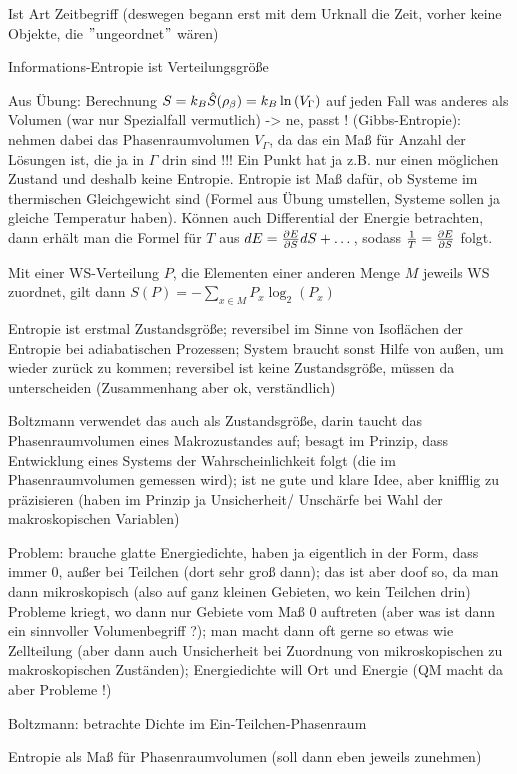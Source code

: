 Ist Art Zeitbegriff (deswegen begann erst mit dem Urknall die Zeit, vorher keine Objekte, die $"$ungeordnet$"$ wären)

Informations-Entropie ist Verteilungsgröße

Aus Übung: Berechnung $S =k_B \hat{S}(\rho_\beta) = k_B \ln\qty(V_\Gamma)$ auf jeden Fall was anderes als Volumen (war nur Spezialfall vermutlich) -> ne, passt ! (Gibbs-Entropie): nehmen dabei das Phasenraumvolumen $V_\Gamma$, da das ein Maß für Anzahl der Lösungen ist, die ja in $\Gamma$ drin sind !!! Ein Punkt hat ja z.B. nur einen möglichen Zustand und deshalb keine Entropie. Entropie ist Maß dafür, ob Systeme im thermischen Gleichgewicht sind (Formel aus Übung umstellen, Systeme sollen ja gleiche Temperatur haben). Können auch Differential der Energie betrachten, dann erhält man die Formel für $T$ aus $dE = \pdv{E}{S} dS + \dots$, sodass $\frac{1}{T} = \pdv{E}{S}$ folgt.

Mit einer WS-Verteilung $P$, die Elementen einer anderen Menge $M$ jeweils WS zuordnet, gilt dann $S(P) = - \sum\limits_{x \in M} P_x \log_2(P_x)$

Entropie ist erstmal Zustandsgröße; reversibel im Sinne von Isoflächen der Entropie bei adiabatischen Prozessen; System braucht sonst Hilfe von außen, um wieder zurück zu kommen; reversibel ist keine Zustandsgröße, müssen da unterscheiden (Zusammenhang aber ok, verständlich)

Boltzmann verwendet das auch als Zustandsgröße, darin taucht das Phasenraumvolumen eines Makrozustandes auf; besagt im Prinzip, dass Entwicklung eines Systems der Wahrscheinlichkeit folgt (die im Phasenraumvolumen gemessen wird); ist ne gute und klare Idee, aber knifflig zu präzisieren (haben im Prinzip ja Unsicherheit/ Unschärfe bei Wahl der makroskopischen Variablen)

Problem: brauche glatte Energiedichte, haben ja eigentlich in der Form, dass immer 0, außer bei Teilchen (dort sehr groß dann); das ist aber doof so, da man dann mikroskopisch (also auf ganz kleinen Gebieten, wo kein Teilchen drin) Probleme kriegt, wo dann nur Gebiete vom Maß 0 auftreten (aber was ist dann ein sinnvoller Volumenbegriff ?); man macht dann oft gerne so etwas wie Zellteilung (aber dann auch Unsicherheit bei Zuordnung von mikroskopischen zu makroskopischen Zuständen); Energiedichte will Ort und Energie (QM macht da aber Probleme !)

Boltzmann: betrachte Dichte im Ein-Teilchen-Phasenraum

Entropie als Maß für Phasenraumvolumen (soll dann eben jeweils zunehmen)

